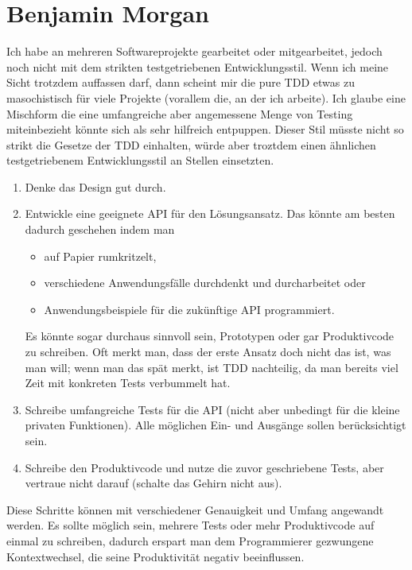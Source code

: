 \documentclass{mitschrift}
\newcommand{\bmn}{\marginpar{Benjamin\\Morgan}}
\begin{document}
\section{Benjamin Morgan}\label{Erfahrungsbericht Ben}\bmn
Ich habe an mehreren Softwareprojekte gearbeitet oder mitgearbeitet, jedoch
noch nicht mit dem strikten testgetriebenen Entwicklungsstil. Wenn ich meine
Sicht trotzdem auffassen darf, dann scheint mir die pure TDD etwas zu
masochistisch für viele Projekte (vorallem die, an der ich arbeite). Ich glaube
eine Mischform die eine umfangreiche aber angemessene Menge von Testing
miteinbezieht könnte sich als sehr hilfreich entpuppen. Dieser Stil müsste
nicht so strikt die Gesetze der TDD einhalten, würde aber troztdem einen
ähnlichen testgetriebenem Entwicklungsstil an Stellen einsetzten.

\begin{enumerate}
    \item Denke das Design gut durch.
    \item Entwickle eine geeignete API für den Lösungsansatz. Das könnte am
        besten dadurch geschehen indem man
        \begin{itemize}
            \item auf Papier rumkritzelt,
            \item verschiedene Anwendungsfälle durchdenkt und durcharbeitet
                oder
            \item Anwendungsbeispiele für die zukünftige API programmiert.
        \end{itemize}
        Es könnte sogar durchaus sinnvoll sein, Prototypen oder gar
        Produktivcode zu schreiben. Oft merkt man, dass der erste Ansatz
        doch nicht das ist, was man will; wenn man das spät merkt, ist TDD
        nachteilig, da man bereits viel Zeit mit konkreten Tests verbummelt
        hat.
    \item Schreibe umfangreiche Tests für die API (nicht aber unbedingt für die
        kleine privaten Funktionen). Alle möglichen Ein- und Ausgänge sollen
        berücksichtigt sein.
    \item Schreibe den Produktivcode und nutze die zuvor geschriebene Tests,
        aber vertraue nicht darauf (schalte das Gehirn nicht aus).
\end{enumerate}

Diese Schritte können mit verschiedener Genauigkeit und Umfang angewandt
werden. Es sollte möglich sein, mehrere Tests oder mehr Produktivcode auf
einmal zu schreiben, dadurch erspart man dem Programmierer gezwungene
Kontextwechsel, die seine Produktivität negativ beeinflussen.
\end{document}
